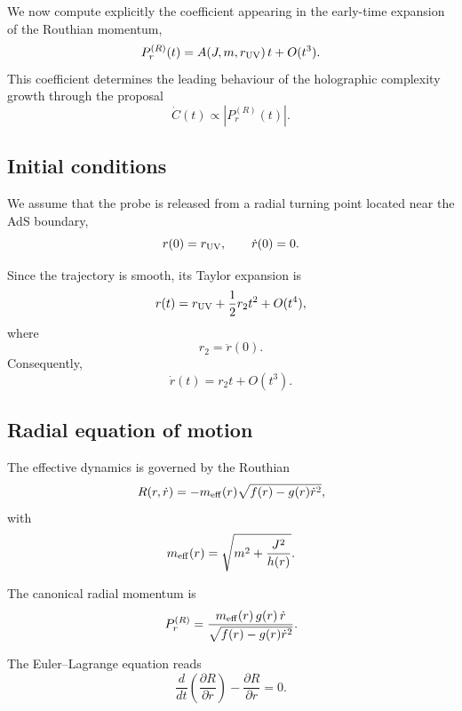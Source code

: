 \documentclass[11pt]{article}
\begin{document}
We now compute explicitly the coefficient appearing in the early-time expansion of the Routhian momentum,
\begin{equation}
P_r^{(R)}(t)
=
A(J,m,r_{\rm UV})\,t
+
O(t^3).
\end{equation}
This coefficient determines the leading behaviour of the holographic complexity growth through the proposal
\begin{equation}
\dot C(t)\propto |P_r^{(R)}(t)|.
\end{equation}

\subsection{Initial conditions}

We assume that the probe is released from a radial turning point located near the AdS boundary,
\begin{equation}
r(0)=r_{\rm UV},
\qquad
\dot r(0)=0.
\end{equation}

Since the trajectory is smooth, its Taylor expansion is
\begin{equation}
r(t)
=
r_{\rm UV}
+\frac12 r_2t^2
+
O(t^4),
\end{equation}
where
\begin{equation}
r_2=\ddot r(0).
\end{equation}
Consequently,
\begin{equation}
\dot r(t)
=
r_2t
+
O(t^3).
\end{equation}

\subsection{Radial equation of motion}

The effective dynamics is governed by the Routhian
\begin{equation}
R(r,\dot r)
=
-
m_{\rm eff}(r)
\sqrt{f(r)-g(r)\dot r^2},
\end{equation}
with
\begin{equation}
m_{\rm eff}(r)
=
\sqrt{
m^2+\frac{J^2}{h(r)}
}.
\end{equation}

The canonical radial momentum is
\begin{equation}
P_r^{(R)}
=
\frac{
m_{\rm eff}(r)\,
g(r)\,
\dot r
}
{
\sqrt{f(r)-g(r)\dot r^2}
}.
\end{equation}

The Euler--Lagrange equation reads
\begin{equation}
\frac{d}{dt}
\left(
\frac{\partial R}{\partial\dot r}
\right)
-
\frac{\partial R}{\partial r}
=
0.
\end{equation}
\end{document}
